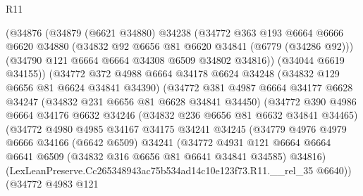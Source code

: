 \begin{lexlean}{R11}
\begin{coremodule}
                    (@34876
                      (@34879
                        (@6621 @34880)
                        @34238
                        (@34772
                          @363
                          @193
                          @6664
                          @6666
                          @6620
                          @34880
                          (@34832 @92 @6656 @81 @6620 @34841 (@6779 (@34286 @92)))
                          (@34790 @121 @6664 @6664 @34308 @6509 @34802 @34816))
                        (@34044 @6619 @34155))
                      (@34772
                        @372
                        @4988
                        @6664
                        @34178
                        @6624
                        @34248
                        (@34832 @129 @6656 @81 @6624 @34841 @34390)
                        (@34772
                          @381
                          @4987
                          @6664
                          @34177
                          @6628
                          @34247
                          (@34832 @231 @6656 @81 @6628 @34841 @34450)
                          (@34772
                            @390
                            @4986
                            @6664
                            @34176
                            @6632
                            @34246
                            (@34832 @236 @6656 @81 @6632 @34841 @34465)
                            (@34772
                              @4980
                              @4985
                              @34167
                              @34175
                              @34241
                              @34245
                              (@34779
                                @4976
                                @4979
                                @6666
                                @34166
                                (@6642 @6509)
                                @34241
                                (@34772
                                  @4931
                                  @121
                                  @6664
                                  @6664
                                  @6641
                                  @6509
                                  (@34832 @316 @6656 @81 @6641 @34841 @34585)
                                  @34816)
                                (LexLeanPreserve.Cc265348943ac75b534ad14c10e123f73.R11.__rel_35
                                  @6640))
                              (@34772
                                @4983
                                @121

\end{coremodule}
\end{lexlean}
